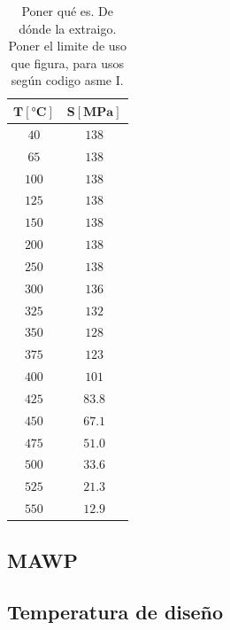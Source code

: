\begin{table}[!ht]
     \centering
     \begin{tabular}{cc}
         \hline
         $\mathbf{T \left[\si{\celsius}\right]}$ & $\mathbf{S \left[\si{MPa}\right]}$ \\
         \hline
         $\num{40}$ & $\num{138}$ \\
         \hline
         $\num{65}$ & $\num{138}$ \\
         \hline
         $\num{100}$ & $\num{138}$ \\
         \hline
         $\num{125}$ & $\num{138}$ \\
         \hline
         $\num{150}$ & $\num{138}$ \\
         \hline
         $\num{200}$ & $\num{138}$ \\
         \hline
         $\num{250}$ & $\num{138}$ \\
         \hline
         $\num{300}$ & $\num{136}$ \\
         \hline
         $\num{325}$ & $\num{132}$ \\
         \hline
         $\num{350}$ & $\num{128}$ \\
         \hline
         $\num{375}$ & $\num{123}$ \\
         \hline
         $\num{400}$ & $\num{101}$ \\
         \hline
         $\num{425}$ & $\num{83.8}$ \\
         \hline
         $\num{450}$ & $\num{67.1}$ \\
         \hline
         $\num{475}$ & $\num{51.0}$ \\
         \hline
         $\num{500}$ & $\num{33.6}$ \\
         \hline
         $\num{525}$ & $\num{21.3}$ \\
         \hline
         $\num{550}$ & $\num{12.9}$ \\
         \hline
     \end{tabular}
     \caption{Poner qué es. De dónde la extraigo. Poner el limite de uso que figura, para usos según codigo asme I.}
     \label{tb:SA_516_70_S_value}
 \end{table}

\subsection{MAWP}

\subsection{Temperatura de diseño}

